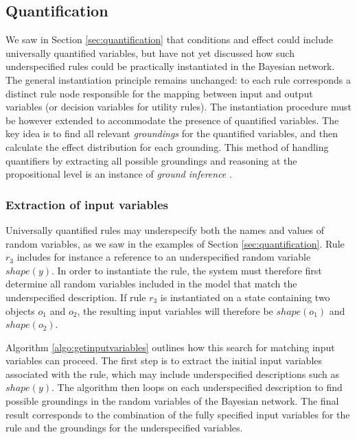 \subsection{Quantification}
\label{sec:applicationquantif}

We saw in Section \ref{sec:quantification} that conditions and effect could include universally quantified variables, but have not yet discussed how such underspecified rules could be practically instantiated in the Bayesian network. The general instantiation principle remains unchanged: to each rule corresponds a distinct rule node responsible for the mapping between input and output variables (or decision variables for utility rules). The instantiation procedure must be however extended to accommodate the presence of quantified variables.  The key idea is to find all relevant \textit{groundings} for the quantified variables, and then calculate the effect distribution for each grounding. This method of handling quantifiers by extracting all possible groundings and reasoning at the propositional level is an instance of \textit{ground inference} \citep{getoor:srlbook07}. 

\subsubsection*{Extraction of input variables}

Universally quantified rules may underspecify both the names and values of random variables, as we saw in the examples of Section \ref{sec:quantification}.  Rule $r_3$ includes for instance a reference to an underspecified random variable $\mathit{shape}(y)$.  In order to instantiate the rule, the system must therefore first determine all random variables included in the model that match the underspecified description. If rule $r_3$ is instantiated on a state containing two objects $o_1$ and $o_2$, the resulting input variables will therefore be $\mathit{shape}(o_1)$ and $\mathit{shape}(o_2)$. 

Algorithm \ref{algo:getinputvariables} outlines how this search for matching input variables can proceed. The first step is to extract the initial input variables associated with the rule, which may include underspecified descriptions such as $\mathit{shape}(y)$. The algorithm then loops on each underspecified description to find possible groundings in the random variables of the Bayesian network.  The final result corresponds to the combination of the fully specified input variables for the rule and the groundings for the underspecified variables.  

